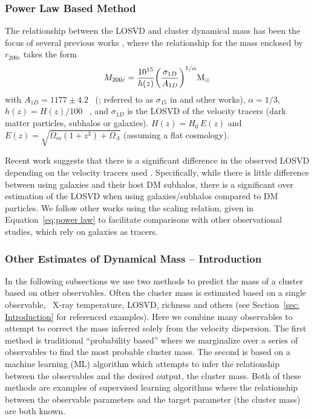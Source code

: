 \documentclass[fleqn,usenatbib]{mnras}
\begin{document}
\subsubsection{Power Law Based Method}
The relationship between the LOSVD and cluster dynamical mass has been the focus of several previous works , where the relationship for the mass enclosed by $r_{200c}$ takes the form
\begin{equation}\label{eq:power law}
	M_{200c} = \frac{10^{15}}{h(z)} \bigg{(}\frac{\sigma_{1D}}{A_{1D}} \bigg{)}^{1/\alpha} \hbox{$\mathrm{M}_\odot$}
\end{equation}
with $A_{1D} = 1177 \pm 4.2$ \kms\ (\citealt{Munari2013}; referred to as $\sigma_{15}$ in \citealt{Evrard2008} and other works), $\alpha = 1/3$, $h(z) = H(z)/100$ \kms\ \mpc, and $\sigma_{1D}$ is the LOSVD of the velocity tracers (dark matter particles, subhalos or galaxies). $H(z) = H_0\, E(z)$ and $E(z) = \sqrt{\Omega_m(1+z^3)+\Omega_{\Lambda}}$ (assuming a flat cosmology).

Recent work suggests that there is a significant difference in the observed LOSVD depending on the velocity tracers used \citep{Munari2013}. Specifically, while there is little difference between using galaxies and their host DM subhalos, there is a significant over estimation of the LOSVD when using galaxies/subhalos compared to DM particles. We follow other works  using the scaling relation, given in Equation~\ref{eq:power law} to facilitate comparisons with other observational studies, which rely on galaxies as tracers. 

\subsubsection{Other Estimates of Dynamical Mass -- Introduction}
In the following subsections we use two methods to predict the mass of a cluster based on other observables. Often the cluster mass is estimated based on a single observable, \eg\ X-ray temperature, LOSVD, richness and others (see Section~\ref{sec: Introduction} for referenced examples). Here we combine many observables to attempt to correct the mass inferred solely from the velocity dispersion. The first method is traditional ``probability based'' where we marginalize over a series of observables to find the most probable cluster mass. The second is based on a machine learning (ML) algorithm which attempts to infer the relationship between the observables and the desired output, the cluster mass. Both of these methods are examples of supervised learning algorithms where the relationship between the observable parameters and the target parameter (the cluster mass) are both known.
\end{document}
